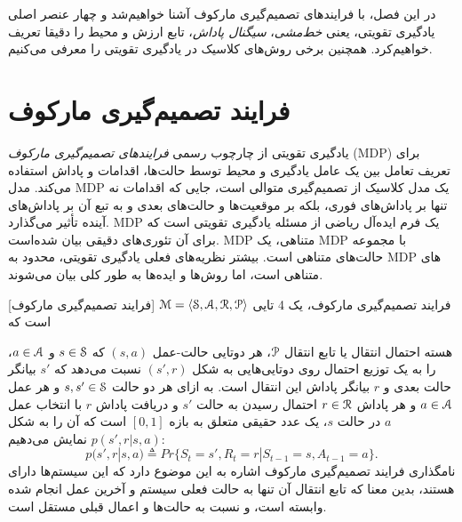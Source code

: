 
  در این فصل، با فرایندهای تصمیم‌گیری مارکوف آشنا خواهیم‌شد و چهار عنصر اصلی یادگیری تقویتی، یعنی \textit{خط‌مشی}، \textit{سیگنال پاداش}، تابع ارزش و محیط را دقیقا تعریف خواهیم‌کرد. همچنین برخی روش‌های کلاسیک در یادگیری تقویتی را معرفی می‌کنیم.



\section{فرایند تصمیم‌گیری مارکوف}

یادگیری تقویتی از چارچوب رسمی \textit{فرایندهای تصمیم‌گیری مارکوف} 
 (MDP)
 برای تعریف تعامل بین یک عامل یادگیری و محیط توسط حالت‌ها، اقدامات و پاداش استفاده می‌کند. مدل MDP یک مدل کلاسیک از تصمیم‌گیری متوالی است، جایی که اقدامات نه تنها بر پاداش‌های فوری، بلکه بر موقعیت‌ها و حالت‌های بعدی و به تبع آن بر پاداش‌های آینده تأثیر می‌گذارد.
MDP
 یک فرم ایده‌آل ریاضی از مسئله یادگیری تقویتی است که برای آن تئوری‌های دقیقی بیان شده‌است.
MDP متناهی،
 یک MDP با مجموعه حالت‌های متناهی است. 
بیشتر نظریه‌های فعلی یادگیری تقویتی، محدود به MDP  های متناهی است، اما روش‌ها و ایده‌ها به طور کلی بیان می‌شوند.


[فرایند تصمیم‌گیری مارکوف] 
 فرایند تصمیم‌گیری مارکوف، یک 4 تایی 
$\EuScript{M} = \left< \EuScript{S},\EuScript{A},\EuScript{R},\EuScript{P} \right>$
است که


هسته احتمال انتقال یا تابع انتقال $\EuScript{P}$، هر دوتایی حالت-عمل
$(s,a)$ که 
$s \in \EuScript{S}$
و
$a \in \EuScript{A}$، را به یک توزیع احتمال روی دوتایی‌هایی به شکل 
$(s',r)$
نسبت می‌دهد که $s'$ بیانگر حالت بعدی و $r$ بیانگر پاداش این انتقال است. به ازای هر دو حالت 
$s,s' \in \EuScript{S}$
 و هر عمل 
 $a \in \EuScript{A}$
  و هر پاداش 
  $r \in \EuScript{R}$
  احتمال رسیدن به حالت $s'$ و دریافت پاداش $r$ با انتخاب عمل $a$ در حالت $s$، یک عدد حقیقی متعلق به  بازه $[0,1]$ است که آن را به شکل
$p(s',r|s,a)$
نمایش می‌دهیم:
$$p(s',r|s,a) \triangleq Pr\{S_t=s',R_t=r|S_{t-1}=s,A_{t-1}=a\}.$$ 
نامگذاری فرایند تصمیم‌گیری مارکوف اشاره به این موضوع دارد که این سیستم‌ها دارای   هستند، بدین معنا که تابع انتقال آن تنها به حالت فعلی سیستم و آخرین عمل انجام شده وابسته است، و نسبت به حالت‌ها و اعمال قبلی مستقل است.

